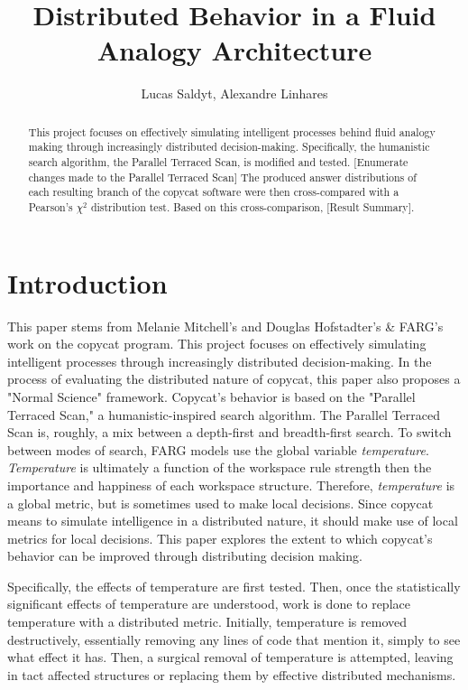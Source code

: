 \documentclass[a4paper]{article}
\title{Distributed Behavior in a Fluid Analogy Architecture}
\author{Lucas Saldyt, Alexandre Linhares}
\begin{document}
\maketitle

\begin{abstract}
This project focuses on effectively simulating intelligent processes behind fluid analogy making through increasingly distributed decision-making.
Specifically, the humanistic search algorithm, the Parallel Terraced Scan, is modified and tested.
[Enumerate changes made to the Parallel Terraced Scan]
The produced answer distributions of each resulting branch of the copycat software were then cross-compared with a Pearson's $\chi^2$ distribution test.
Based on this cross-comparison, [Result Summary].
\end{abstract}

\section{Introduction}

This paper stems from Melanie Mitchell's \cite{analogyasperception} and Douglas Hofstadter's \& FARG's \cite{fluidconcepts} work on the copycat program. 
This project focuses on effectively simulating intelligent processes through increasingly distributed decision-making.
In the process of evaluating the distributed nature of copycat, this paper also proposes a "Normal Science" framework. 
Copycat's behavior is based on the "Parallel Terraced Scan," a humanistic-inspired search algorithm.
The Parallel Terraced Scan is, roughly, a mix between a depth-first and breadth-first search.
To switch between modes of search, FARG models use the global variable \emph{temperature}.
\emph{Temperature} is ultimately a function of the workspace rule strength then the importance and happiness of each workspace structure.
Therefore, \emph{temperature} is a global metric, but is sometimes used to make local decisions.
Since copycat means to simulate intelligence in a distributed nature, it should make use of local metrics for local decisions.
This paper explores the extent to which copycat's behavior can be improved through distributing decision making.

Specifically, the effects of temperature are first tested. 
Then, once the statistically significant effects of temperature are understood, work is done to replace temperature with a distributed metric.
Initially, temperature is removed destructively, essentially removing any lines of code that mention it, simply to see what effect it has.
Then, a surgical removal of temperature is attempted, leaving in tact affected structures or replacing them by effective distributed mechanisms.
\end{document}
